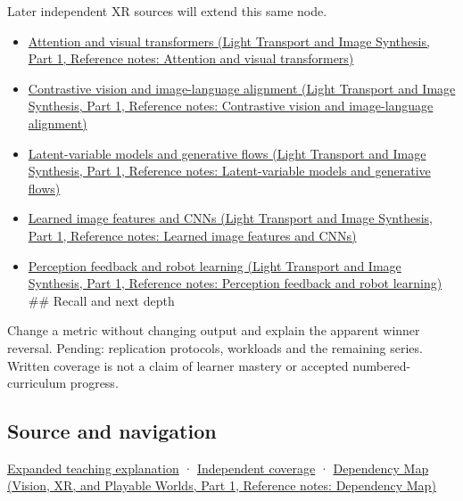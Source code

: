 Later independent XR sources will extend this same node.

\begin{itemize}
\tightlist
\item
  \href{../04-Light-Transport-and-Image-Synthesis-P01/main.pdf\#nameddest=appendix-a9d5dfdd164a}{Attention and visual transformers (Light Transport and Image Synthesis, Part 1, Reference notes: Attention and visual transformers)}
\item
  \href{../04-Light-Transport-and-Image-Synthesis-P01/main.pdf\#nameddest=appendix-772f1fd96148}{Contrastive vision and image-language alignment (Light Transport and Image Synthesis, Part 1, Reference notes: Contrastive vision and image-language alignment)}
\item
  \href{../04-Light-Transport-and-Image-Synthesis-P01/main.pdf\#nameddest=appendix-2c568f05ee34}{Latent-variable models and generative flows (Light Transport and Image Synthesis, Part 1, Reference notes: Latent-variable models and generative flows)}
\item
  \href{../04-Light-Transport-and-Image-Synthesis-P01/main.pdf\#nameddest=appendix-47c51ea026fb}{Learned image features and CNNs (Light Transport and Image Synthesis, Part 1, Reference notes: Learned image features and CNNs)}
\item
  \href{../04-Light-Transport-and-Image-Synthesis-P01/main.pdf\#nameddest=appendix-b0c42da325f1}{Perception feedback and robot learning (Light Transport and Image Synthesis, Part 1, Reference notes: Perception feedback and robot learning)} \#\# Recall and next depth
\end{itemize}

Change a metric without changing output and explain the apparent winner reversal. Pending: replication protocols, workloads and the remaining series. Written coverage is not a claim of learner mastery or accepted numbered-curriculum progress.

\subsection{Source and navigation}\label{appendix-65788587ef78-source-and-navigation}

\hypertarget{appendix-65788587ef78-source-and-navigation}{}

\hyperref[04-visual-computing-ii-ch042-make-the-mathematics-operational-without-pretending-to-run-a-human-study]{Expanded teaching explanation} · \hyperref[appendix-fd090d982a15-xr01---independent-seeing-and-representation-source]{Independent coverage} · \href{../07-Vision-XR-and-Playable-Worlds-P01/main.pdf\#nameddest=appendix-4ad47bdd269a}{Dependency Map (Vision, XR, and Playable Worlds, Part 1, Reference notes: Dependency Map)}
